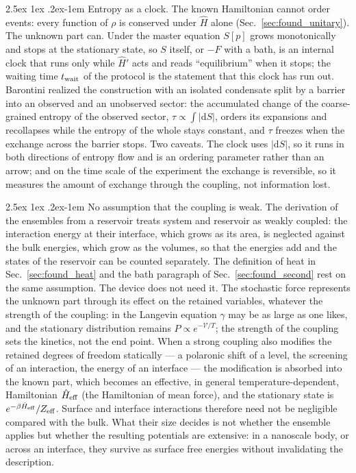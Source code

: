 \documentclass[10pt,a4paper]{article}
\makeatletter
\renewcommand{\paragraph}{\@startsection{paragraph}{4}{\z@}%
  {2.5ex \@plus 1ex \@minus .2ex}{-1em}%
  {\normalfont\fontsize{14pt}{17pt}\selectfont\bfseries}}
\newcommand{\dd}{\mathrm{d}}
\makeatother
\begin{document}
\paragraph{Entropy as a clock.}
The known Hamiltonian cannot order events: every function of $ \rho $ is conserved under $ \hat H $ alone (Sec.~\ref{sec:found_unitary}).
The unknown part can.
Under the master equation $ S[p] $ grows monotonically and stops at the stationary state, so $ S $ itself, or $ -F $ with a bath, is an internal clock that runs only while $ \hat H' $ acts and reads ``equilibrium'' when it stops; the waiting time $ t_{\rm wait} $ of the protocol is the statement that this clock has run out.
Barontini \cite{Barontini} realized the construction with an isolated condensate split by a barrier into an observed and an unobserved sector: the accumulated change of the coarse-grained entropy of the observed sector, $ \tau \propto \int|\dd S| $, orders its expansions and recollapses while the entropy of the whole stays constant, and $ \tau $ freezes when the exchange across the barrier stops.
Two caveats.
The clock uses $ |\dd S| $, so it runs in both directions of entropy flow and is an ordering parameter rather than an arrow; and on the time scale of the experiment the exchange is reversible, so it measures the amount of exchange through the coupling, not information lost.

\paragraph{No assumption that the coupling is weak.}
The derivation of the ensembles from a reservoir treats system and reservoir as weakly coupled: the interaction energy at their interface, which grows as its area, is neglected against the bulk energies, which grow as the volumes, so that the energies add and the states of the reservoir can be counted separately.
The definition of heat in Sec.~\ref{sec:found_heat} and the bath paragraph of Sec.~\ref{sec:found_second} rest on the same assumption.
The device does not need it.
The stochastic force represents the unknown part through its effect on the retained variables, whatever the strength of the coupling: in the Langevin equation $ \gamma $ may be as large as one likes, and the stationary distribution remains $ P \propto e^{-\mathcal{V}/T} $; the strength of the coupling sets the kinetics, not the end point.
When a strong coupling also modifies the retained degrees of freedom statically --- a polaronic shift of a level, the screening of an interaction, the energy of an interface --- the modification is absorbed into the known part, which becomes an effective, in general temperature-dependent, Hamiltonian $ \hat H_{\rm eff} $ (the Hamiltonian of mean force), and the stationary state is $ e^{-\beta\hat H_{\rm eff}}/Z_{\rm eff} $.
Surface and interface interactions therefore need not be negligible compared with the bulk.
What their size decides is not whether the ensemble applies but whether the resulting potentials are extensive: in a nanoscale body, or across an interface, they survive as surface free energies without invalidating the description.
\end{document}
